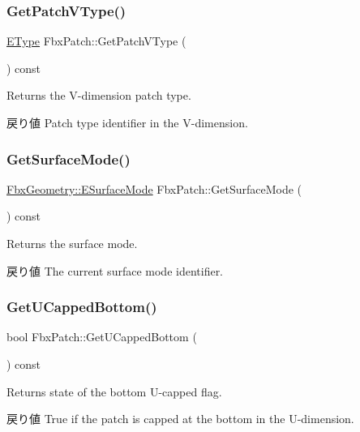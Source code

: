 \subsubsection{\texorpdfstring{Get\+Patch\+V\+Type()}{GetPatchVType()}}
{\footnotesize\ttfamily \hyperlink{class_fbx_patch_ad669936e6b844a7a15fa30ec7c183fbb}{E\+Type} Fbx\+Patch\+::\+Get\+Patch\+V\+Type (\begin{DoxyParamCaption}{ }\end{DoxyParamCaption}) const}

Returns the V-\/dimension patch type. \begin{DoxyReturn}{戻り値}
Patch type identifier in the V-\/dimension. 
\end{DoxyReturn}
\mbox{\label{class_fbx_patch_a0621b866f54824bdccdbae5ae2a58e28}} 
\subsubsection{\texorpdfstring{Get\+Surface\+Mode()}{GetSurfaceMode()}}
{\footnotesize\ttfamily \hyperlink{class_fbx_geometry_adb9d2e34481a2cb40f1d783c665794db}{Fbx\+Geometry\+::\+E\+Surface\+Mode} Fbx\+Patch\+::\+Get\+Surface\+Mode (\begin{DoxyParamCaption}{ }\end{DoxyParamCaption}) const}

Returns the surface mode. \begin{DoxyReturn}{戻り値}
The current surface mode identifier. 
\end{DoxyReturn}
\mbox{\label{class_fbx_patch_af134ac0b9f507a259fb20426647b49ed}} 
\subsubsection{\texorpdfstring{Get\+U\+Capped\+Bottom()}{GetUCappedBottom()}}
{\footnotesize\ttfamily bool Fbx\+Patch\+::\+Get\+U\+Capped\+Bottom (\begin{DoxyParamCaption}{ }\end{DoxyParamCaption}) const}

Returns state of the bottom U-\/capped flag. \begin{DoxyReturn}{戻り値}
{\ttfamily True} if the patch is capped at the bottom in the U-\/dimension. 
\end{DoxyReturn}
\mbox{\label{class_fbx_patch_a97f060bdd4c569854101b1a2a0750534}} 

